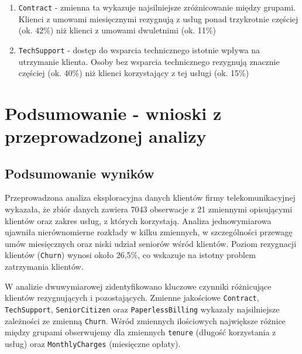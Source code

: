 \documentclass[12pt, a4paper]{article}\usepackage[]{graphicx}\usepackage[]{xcolor}
\begin{document}
\begin{enumerate}
  \item \texttt{Contract} - zmienna ta wykazuje najsilniejsze zróżnicowanie między grupami. Klienci z umowami miesięcznymi rezygnują z usług ponad trzykrotnie częściej (ok. 42\%) niż klienci z umowami dwuletnimi (ok. 11\%)
  
  \item \texttt{TechSupport} - dostęp do wsparcia technicznego istotnie wpływa na utrzymanie klienta. Osoby bez wsparcia technicznego rezygnują znacznie częściej (ok. 40\%) niż klienci korzystający z tej usługi (ok. 15\%)

\end{enumerate}



\newpage
\section{Podsumowanie - wnioski z przeprowadzonej analizy}

\subsection{Podsumowanie wyników}
Przeprowadzona analiza eksploracyjna danych klientów firmy telekomunikacyjnej wykazała, że zbiór danych zawiera 7043 obserwacje z 21 zmiennymi opisującymi klientów oraz zakres usług, z których korzystają. Analiza jednowymiarowa ujawniła nierównomierne rozkłady w kilku zmiennych, w szczególności przewagę umów miesięcznych oraz niski udział seniorów wśród klientów. Poziom rezygnacji klientów (\texttt{Churn}) wynosi około 26,5\%, co wskazuje na istotny problem zatrzymania klientów.

W analizie dwuwymiarowej zidentyfikowano kluczowe czynniki różnicujące klientów rezygnujących i pozostających. Zmienne jakościowe \texttt{Contract}, \texttt{TechSupport}, \texttt{SeniorCitizen} oraz \texttt{PaperlessBilling} wykazały najsilniejsze zależności ze zmienną \texttt{Churn}. Wśród zmiennych ilościowych największe różnice między grupami obserwujemy dla zmiennych \texttt{tenure} (długość korzystania z usług) oraz \texttt{MonthlyCharges} (miesięczne opłaty).
\end{document}
